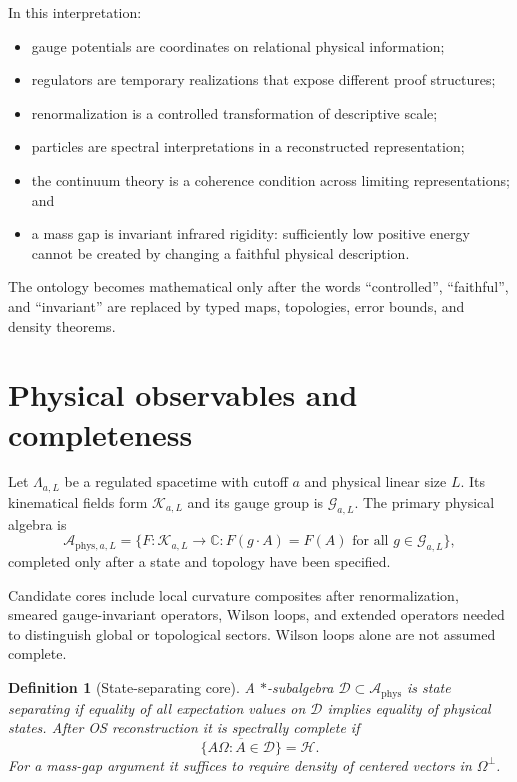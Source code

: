 \documentclass[11pt]{article}
\newcommand{\Aphys}{\mathcal A_{\mathrm{phys}}}
\newtheorem{definition}{Definition}[section]
\theoremstyle{remark}
\begin{document}
In this interpretation:
\begin{itemize}[itemsep=2pt]
\item gauge potentials are coordinates on relational physical information;
\item regulators are temporary realizations that expose different proof
      structures;
\item renormalization is a controlled transformation of descriptive scale;
\item particles are spectral interpretations in a reconstructed
      representation;
\item the continuum theory is a coherence condition across limiting
      representations; and
\item a mass gap is invariant infrared rigidity: sufficiently low positive
      energy cannot be created by changing a faithful physical description.
\end{itemize}

The ontology becomes mathematical only after the words ``controlled'',
``faithful'', and ``invariant'' are replaced by typed maps, topologies, error
bounds, and density theorems.

\section{Physical observables and completeness}

Let $\Lambda_{a,L}$ be a regulated spacetime with cutoff $a$ and physical
linear size $L$.  Its kinematical fields form $\mathcal K_{a,L}$ and its gauge
group is $\mathcal G_{a,L}$.  The primary physical algebra is
\[
 \mathcal A_{\mathrm{phys},a,L}
  =\{F:\mathcal K_{a,L}\to\mathbb C:
          F(g\cdot A)=F(A)\text{ for all }g\in\mathcal G_{a,L}\},
\]
completed only after a state and topology have been specified.

Candidate cores include local curvature composites after renormalization,
smeared gauge-invariant operators, Wilson loops, and extended operators needed
to distinguish global or topological sectors.  Wilson loops alone are not
assumed complete.

\begin{definition}[State-separating core]
A $*$-subalgebra $\mathcal D\subset\Aphys$ is state separating if equality of
all expectation values on $\mathcal D$ implies equality of physical states.
After OS reconstruction it is \emph{spectrally complete} if
\[
 \overline{\{A\Omega:A\in\mathcal D\}}=\mathcal H.
\]
For a mass-gap argument it suffices to require density of centered vectors in
$\Omega^\perp$.
\end{definition}
\end{document}
